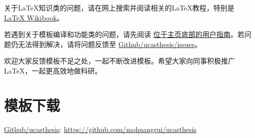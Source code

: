 关于\LaTeX{}知识类的问题，请在网上搜索并阅读相关的\LaTeX{}教程，特别是 \href{https://en.wikibooks.org/wiki/LaTeX}{\LaTeX{} Wikibook}。

若遇到关于模板编译和功能类的问题，请先阅读 \href{https://github.com/mohuangrui/ucasthesis}{位于主页底部的用户指南}。若问题仍无法得到解决，请将问题反馈至 \href{https://github.com/mohuangrui/ucasthesis/issues}{Github/ucasthesis/issues}。

欢迎大家反馈模板不足之处，一起不断改进模板。希望大家向同事积极推广\LaTeX{}，一起更高效地做科研。

\section{模板下载}

\begin{center}
    \href{https://github.com/mohuangrui/ucasthesis}{Github/ucasthesis}: \url{https://github.com/mohuangrui/ucasthesis}
\end{center}
